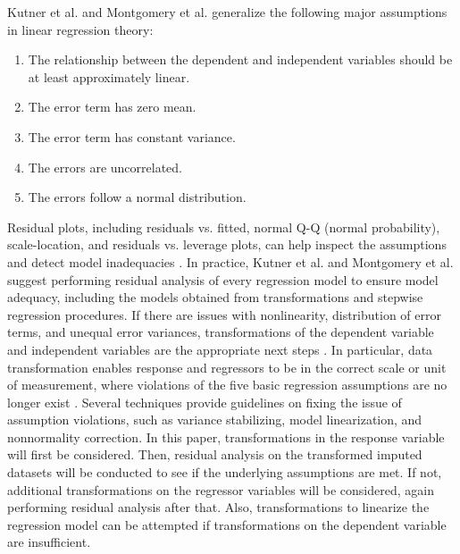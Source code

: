 \documentclass[11pt]{article}
\begin{document}
Kutner et al. \cite{bk:kutner} and Montgomery et al. \cite{bk:montgomery} generalize the following major assumptions in linear regression theory:
\begin{enumerate}
\item The relationship between the dependent and independent variables should be at least approximately linear.
\item The error term has zero mean.
\item The error term has constant variance.
\item The errors are uncorrelated.
\item The errors follow a normal distribution.
\end{enumerate}
Residual plots, including residuals vs. fitted, normal Q-Q (normal probability), scale-location, and residuals vs. leverage plots, can help inspect the assumptions and detect model inadequacies \cite{bk:kutner, bk:montgomery}. In practice, Kutner et al. \cite{bk:kutner} and Montgomery et al. \cite{bk:montgomery} suggest performing residual analysis of every regression model to ensure model adequacy, including the models obtained from transformations and stepwise regression procedures. If there are issues with nonlinearity, distribution of error terms, and unequal error variances, transformations of the dependent variable and independent variables are the appropriate next steps \cite{bk:kutner}. In particular, data transformation enables response and regressors to be in the correct scale or unit of measurement, where violations of the five basic regression assumptions are no longer exist \cite{bk:montgomery}. Several techniques provide guidelines on fixing the issue of assumption violations, such as variance stabilizing, model linearization, and nonnormality correction. In this paper, transformations in the response variable will first be considered. Then, residual analysis on the transformed imputed datasets will be conducted to see if the underlying assumptions are met. If not, additional transformations on the regressor variables will be considered, again performing residual analysis after that. Also, transformations to linearize the regression model can be attempted if transformations on the dependent variable are insufficient.
\end{document}
